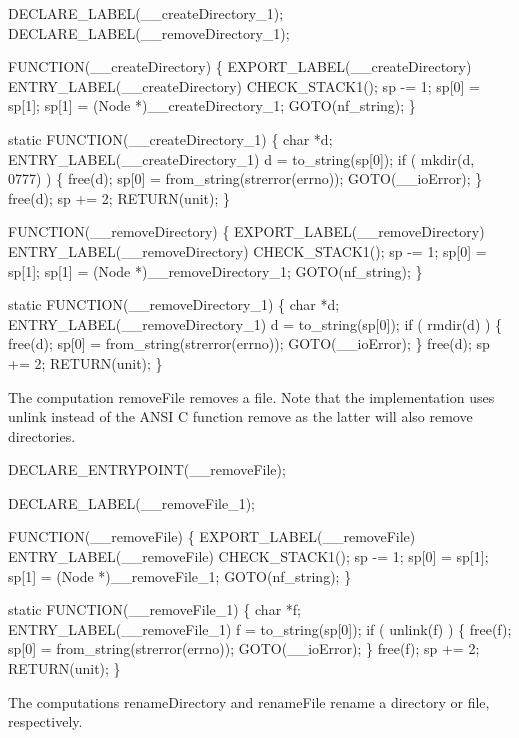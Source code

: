 DECLARE_LABEL(__createDirectory_1);
DECLARE_LABEL(__removeDirectory_1);

FUNCTION(__createDirectory)
\{
    EXPORT_LABEL(__createDirectory)
 ENTRY_LABEL(__createDirectory)
    CHECK_STACK1();
    sp   -= 1;
    sp[0] = sp[1];
    sp[1] = (Node *)__createDirectory_1;
    GOTO(nf_string);
\}

static
FUNCTION(__createDirectory_1)
\{
    char *d;
 ENTRY_LABEL(__createDirectory_1)
    d = to_string(sp[0]);
    if ( mkdir(d, 0777) )
    \{
        free(d);
        sp[0] = from_string(strerror(errno));
        GOTO(__ioError);
    \}
    free(d);
    sp += 2;
    RETURN(unit);
\}

FUNCTION(__removeDirectory)
\{
    EXPORT_LABEL(__removeDirectory)
 ENTRY_LABEL(__removeDirectory)
    CHECK_STACK1();
    sp   -= 1;
    sp[0] = sp[1];
    sp[1] = (Node *)__removeDirectory_1;
    GOTO(nf_string);
\}

static
FUNCTION(__removeDirectory_1)
\{
    char *d;
 ENTRY_LABEL(__removeDirectory_1)
    d = to_string(sp[0]);
    if ( rmdir(d) )
    \{
        free(d);
        sp[0] = from_string(strerror(errno));
        GOTO(__ioError);
    \}
    free(d);
    sp += 2;
    RETURN(unit);
\}

\nwendcode{}\nwdocspar
The computation {\Tt{}removeFile\nwendquote} removes a file. Note that the
implementation uses {\Tt{}unlink\nwendquote} instead of the ANSI C function
{\Tt{}remove\nwendquote} as the latter will also remove directories.

\nwenddocs{}\plusendmoddef\nwstartdeflinemarkup{}\nwenddeflinemarkup
DECLARE_ENTRYPOINT(__removeFile);

DECLARE_LABEL(__removeFile_1);

FUNCTION(__removeFile)
\{
    EXPORT_LABEL(__removeFile)
 ENTRY_LABEL(__removeFile)
    CHECK_STACK1();
    sp   -= 1;
    sp[0] = sp[1];
    sp[1] = (Node *)__removeFile_1;
    GOTO(nf_string);
\}

static
FUNCTION(__removeFile_1)
\{
    char *f;
 ENTRY_LABEL(__removeFile_1)
    f = to_string(sp[0]);
    if ( unlink(f) )
    \{
        free(f);
        sp[0] = from_string(strerror(errno));
        GOTO(__ioError);
    \}
    free(f);
    sp += 2;
    RETURN(unit);
\}

\nwendcode{}\nwdocspar
The computations {\Tt{}renameDirectory\nwendquote} and {\Tt{}renameFile\nwendquote} rename a
directory or file, respectively.

